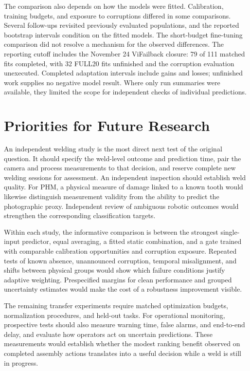 The comparison also depends on how the models were fitted. Calibration, training
budgets, and exposure to corruptions differed in some comparisons. Several follow-ups
revisited previously evaluated populations, and the reported bootstrap intervals
condition on the fitted models. The short-budget fine-tuning comparison did not resolve
a mechanism for the observed differences. The reporting cutoff includes the November 24
ViFailback closure: 79 of 111 matched fits completed, with 32 FULL20 fits unfinished and
the corruption evaluation unexecuted. Completed adaptation intervals include gains and
losses; unfinished work supplies no negative model result. Where only run summaries were
available, they limited the scope for independent checks of individual predictions.

\section{Priorities for Future Research}
An independent welding study is the most direct next test of the original question. It
should specify the weld-level outcome and prediction time, pair the camera and process
measurements to that decision, and reserve complete new welding sessions for assessment.
An independent inspection should establish weld quality. For PHM, a physical measure of
damage linked to a known tooth would likewise distinguish measurement validity from the
ability to predict the photographic proxy. Independent review of ambiguous robotic
outcomes would strengthen the corresponding classification targets.

Within each study, the informative comparison is between the strongest single-input
predictor, equal averaging, a fitted static combination, and a gate trained with
comparable calibration opportunities and corruption exposure. Repeated tests of known
absence, unannounced corruption, temporal misalignment, and shifts between physical
groups would show which failure conditions justify adaptive weighting. Prespecified
margins for clean performance and grouped uncertainty estimates would make the cost of a
robustness improvement visible.

The remaining transfer experiments require matched optimization budgets, normalization
procedures, and held-out tasks. For operational monitoring, prospective tests should
also measure warning time, false alarms, and end-to-end delay, and evaluate how
operators act on uncertain predictions. These measurements would establish whether the
modest ranking benefit observed on completed assembly actions translates into a useful
decision while a weld is still in progress.
